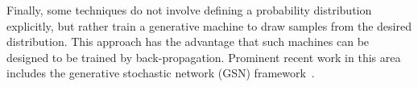 \documentclass[10pt,twocolumn,letterpaper]{article}
\begin{document}
\par Finally, some techniques do not involve defining a probability distribution explicitly, but rather train a generative machine to draw samples from the desired distribution. This approach has the advantage that such machines can be designed to be trained by back-propagation. Prominent recent work in this area includes the generative stochastic network (GSN) framework~\cite{Bengio2014Deep}.

  
 
\end{document}
